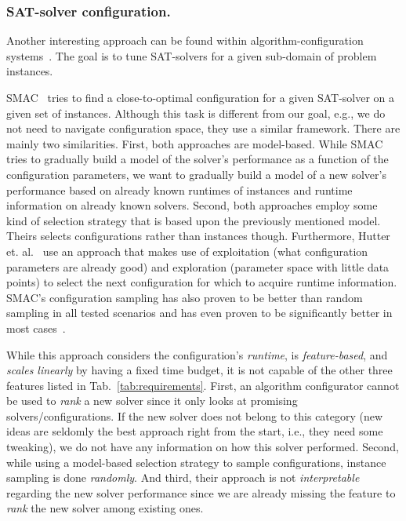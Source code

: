 \documentclass[runningheads]{llncs}
\begin{document}
\subsubsection{SAT-solver configuration.}
Another interesting approach can be found within algorithm-configuration systems~\cite{HutterHL11,HoosHL21,Stutzle0P22}.
The goal is to tune SAT-solvers for a given sub-domain of problem instances.

SMAC~\cite{HutterHL11} tries to find a close-to-optimal configuration for a given SAT-solver on a given set of instances.
Although this task is different from our goal, e.g., we do not need to navigate configuration space, they use a similar framework.
There are mainly two similarities.
First, both approaches are model-based.
While SMAC tries to gradually build a model of the solver's performance as a function of the configuration parameters, we want to gradually build a model of a new solver's performance based on already known runtimes of instances and runtime information on already known solvers.
Second, both approaches employ some kind of selection strategy that is based upon the previously mentioned model.
Theirs selects configurations rather than instances though.
Furthermore, Hutter et. al.~\cite{HutterHL11} use an approach that makes use of exploitation (what configuration parameters are already good) and exploration (parameter space with little data points) to select the next configuration for which to acquire runtime information. SMAC's configuration sampling has also proven to be better than random sampling in all tested scenarios and has even proven to be significantly better in most cases~\cite{HutterHL11}.

While this approach considers the configuration's \textit{runtime}, is \textit{feature-based}, and \textit{scales linearly} by having a fixed time budget, it is not capable of the other three features listed in Tab.~\ref{tab:requirements}.
First, an algorithm configurator cannot be used to \textit{rank} a new solver since it only looks at promising solvers/configurations. If the new solver does not belong to this category (new ideas are seldomly the best approach right from the start, i.e., they need some tweaking), we do not have any information on how this solver performed.
Second, while using a model-based selection strategy to sample configurations, instance sampling is done \textit{randomly}.
And third, their approach is not \textit{interpretable} regarding the new solver performance since we are already missing the feature to \textit{rank} the new solver among existing ones.
\end{document}
